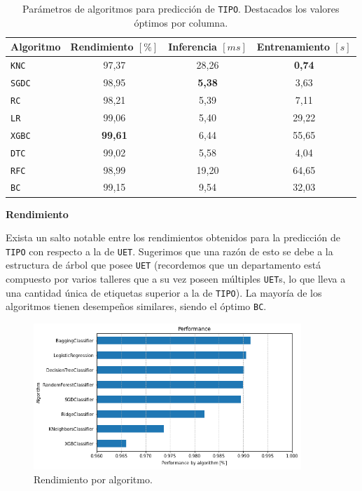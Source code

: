\documentclass[a4paper,12pt]{article}
\begin{document}
		\begin{table}[H]
			\centering
			\begin{tabular}{lccc}
				\hline
				\multicolumn{1}{c}{\textbf{Algoritmo}} &
				\multicolumn{1}{c}{\textbf{Rendimiento $[\%]$}} &
				\multicolumn{1}{c}{\textbf{Inferencia $[ms]$}} &
				\multicolumn{1}{c}{\textbf{Entrenamiento $[s]$}} \\ 
				\hline
				\texttt{KNC}  & 97,37          & 28,26         & \textbf{0,74} \\
				\texttt{SGDC} & 98,95          & \textbf{5,38} & 3,63          \\
				\texttt{RC}   & 98,21          & 5,39          & 7,11          \\
				\texttt{LR}   & 99,06          & 5,40          & 29,22         \\
				\texttt{XGBC} & \textbf{99,61} & 6,44          & 55,65         \\
				\texttt{DTC}  & 99,02          & 5,58          & 4,04          \\
				\texttt{RFC}  & 98,99          & 19,20         & 64,65         \\
				\texttt{BC}   & 99,15          & 9,54          & 32,03         \\ 
				\hline
			\end{tabular}
			\caption{Parámetros de algoritmos para predicción de \texttt{TIPO}. Destacados los valores óptimos por columna.}
			\label{tab:tipo-parameters-algo}
		\end{table}
				
		\textbf{Rendimiento}
				
		Exista un salto notable entre los rendimientos obtenidos para la predicción de \texttt{TIPO} con respecto a la de \texttt{UET}. Sugerimos que una razón de esto se debe a la estructura de árbol que posee \texttt{UET} (recordemos que un departamento está compuesto por varios talleres que a su vez poseen múltiples \texttt{UET}s, lo que lleva a una cantidad única de etiquetas superior a la de \texttt{TIPO}). La mayoría de los algoritmos tienen desempeños similares, siendo el óptimo \texttt{BC}.
				
		\begin{figure}[H]
			\begin{center}
				\includegraphics[width=0.9\textwidth]{perfo_uet_by_algo.png}
				\caption{Rendimiento por algoritmo.}
				\label{fig:perfo_uet_by_algo}
			\end{center}
		\end{figure}
				
\end{document}
